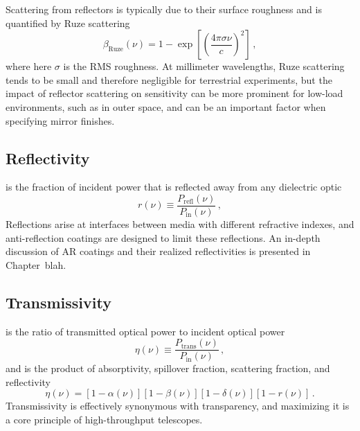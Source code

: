 Scattering from reflectors is typically due to their surface roughness and is quantified by Ruze scattering
\begin{equation}
    \beta_{\mathrm{Ruze}}(\nu) = 1 - \exp \left[ \left( \frac{4 \pi \sigma \nu}{c} \right)^{2} \right] \, ,
    \label{eq:ruze_scattering}
\end{equation}
where here $\sigma$ is the RMS roughness. At millimeter wavelengths, Ruze scattering tends to be small and therefore negligible for terrestrial experiments, but the impact of reflector scattering on sensitivity can be more prominent for low-load environments, such as in outer space, and can be an important factor when specifying mirror finishes.


\subsection{Reflectivity}
\label{sec:sensitivity_reflectivity}

 is the fraction of incident power that is reflected away from any dielectric optic
\begin{equation}
    r(\nu) \equiv \frac{P_{\mathrm{refl}}(\nu)}{P_{\mathrm{in}}(\nu)} \, ,
    \label{eq:reflectivity_definition}
\end{equation}
Reflections arise at interfaces between media with different refractive indexes, and anti-reflection coatings are designed to limit these reflections. An in-depth discussion of AR coatings and their realized reflectivities is presented in Chapter~blah.


\subsection{Transmissivity}
\label{sec:sensitivity_reflectivity}

 is the ratio of transmitted optical power to incident optical power
\begin{equation}
    \eta(\nu) \equiv \frac{P_{\mathrm{trans}}(\nu)}{P_{\mathrm{in}}(\nu)} \, ,
    \label{eq:transmissivity_definition}
\end{equation}
and is the product of absorptivity, spillover fraction, scattering fraction, and reflectivity
\begin{equation}
    \eta(\nu) = \left[ 1 - \alpha(\nu) \right] \left[ 1 - \beta(\nu) \right] \left[ 1 - \delta(\nu) \right] \left[ 1 - r(\nu) \right] \, .
    \label{eq:transmissivity_product}
\end{equation}
Transmissivity is effectively synonymous with transparency, and maximizing it is a core principle of high-throughput telescopes.

